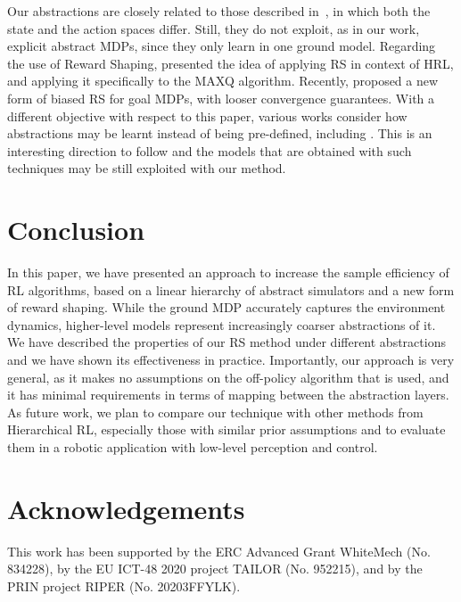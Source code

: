 \documentclass[letterpaper]{article} %
\theoremstyle{plain}
\theoremstyle{definition}
\theoremstyle{remark}
\begin{document}
Our abstractions are closely related to those described
in~\cite{abel_2016_OptimalBehavior, abel_2020_ValuePreserving},
in which both the state and the action spaces differ.
Still, they do not exploit, as in our work, explicit abstract MDPs,
since they only learn in one ground model.
%
Regarding the use of Reward Shaping, \cite{gao2015potential} presented the idea of
applying RS in context of HRL, and applying it specifically to the MAXQ
algorithm.
Recently, \cite{schubert_2021_PlanbasedRelaxed} proposed a new form of biased RS for goal MDPs, with looser convergence guarantees.
%
With a different objective with respect to this paper,
various works consider how abstractions may be learnt instead of being pre-defined, including
\cite{Marthi07automatic-shaping, grzes2008multigrid, steccanella_hierarchical_2021}.
This is an interesting direction to follow and the models that are obtained with such techniques may be still exploited with our method.


\section{Conclusion}

In this paper, we have presented an approach to increase the sample efficiency of RL algorithms,
based on a linear hierarchy of abstract simulators and a new form of reward shaping.
While the ground MDP accurately captures the environment dynamics,
higher-level models represent increasingly coarser abstractions of it. 
We have described the properties of our RS method under different abstractions and we have shown its effectiveness in practice.
Importantly, our approach is very general, as it makes no assumptions on
the off-policy algorithm that is used, and it has minimal requirements in terms of mapping
between the abstraction layers.
As future work, we plan to compare our technique with other methods from Hierarchical RL,
especially those with similar prior assumptions and to evaluate them in a robotic application with low-level perception and control.


\section*{Acknowledgements}
This work has been supported by the ERC Advanced Grant WhiteMech (No. 834228),
by the EU ICT-48 2020 project TAILOR (No. 952215), and by the PRIN project
RIPER (No. 20203FFYLK).




\appendix
\onecolumn
{}

\end{document}
